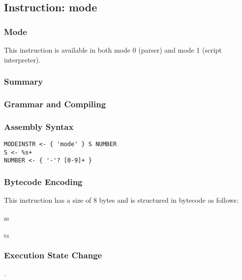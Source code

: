 \subsection{Instruction: mode}

\subsubsection{Mode}
This instruction is available in both mode 0 (parser) and mode 1 (script interpreter).
\subsubsection{Summary}


\subsubsection{Grammar and Compiling}


\subsubsection{Assembly Syntax}

\begin{myquote}
\begin{verbatim}
MODEINSTR <- { 'mode' } S NUMBER
S <- %s+
NUMBER <- { '-'? [0-9]+ }
\end{verbatim}
\end{myquote}

\subsubsection{Bytecode Encoding}

This instruction has a size of 8 bytes and is structured in bytecode as follows:

$_{00}$\ 



$_{04}$\ 


\subsubsection{Execution State Change}

.


